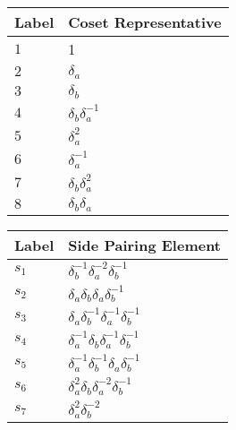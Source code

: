 \documentclass{article}
\begin{document}

\begin{center}
\begin{tabular}{ll}
\toprule
Label & Coset Representative\\
\midrule
$1$ & 1 \\
$2$ & $\delta_a^{}$ \\
$3$ & $\delta_b^{}$ \\
$4$ & $\delta_b^{}\delta_a^{-1}$ \\
$5$ & $\delta_a^{2}$ \\
$6$ & $\delta_a^{-1}$ \\
$7$ & $\delta_b^{}\delta_a^{2}$ \\
$8$ & $\delta_b^{}\delta_a^{}$ \\
\bottomrule
\end{tabular}
\hfill
\begin{tabular}{ll}
\toprule
Label & Side Pairing Element\\
\midrule
$s_{1}$ & $\delta_b^{-1}\delta_a^{-2}\delta_b^{-1}$ \\
$s_{2}$ & $\delta_a^{}\delta_b^{}\delta_a^{}\delta_b^{-1}$ \\
$s_{3}$ & $\delta_a^{}\delta_b^{-1}\delta_a^{-1}\delta_b^{-1}$ \\
$s_{4}$ & $\delta_a^{-1}\delta_b^{}\delta_a^{-1}\delta_b^{-1}$ \\
$s_{5}$ & $\delta_a^{-1}\delta_b^{-1}\delta_a^{}\delta_b^{-1}$ \\
$s_{6}$ & $\delta_a^{2}\delta_b^{}\delta_a^{-2}\delta_b^{-1}$ \\
$s_{7}$ & $\delta_a^{2}\delta_b^{-2}$ \\
\bottomrule
\end{tabular}
\end{center}

\thispagestyle{empty}
\end{document}
